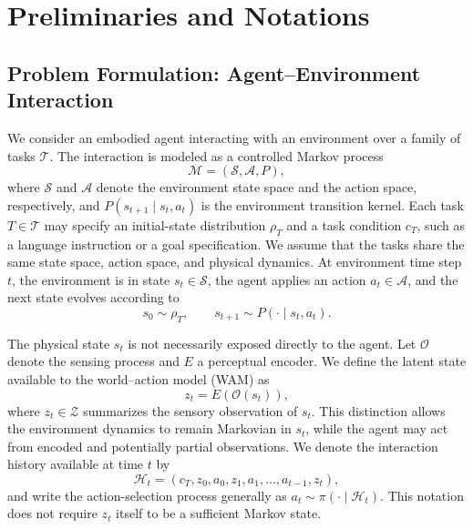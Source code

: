 
\section{Preliminaries and Notations}
\label{sec:preliminaries}


\subsection{Problem Formulation: Agent--Environment Interaction}
\label{sec:preliminaries:problem}

We consider an embodied agent interacting with an environment over a family of tasks
$\mathcal{T}$. The interaction is modeled as a controlled Markov process
\begin{equation}
    \mathcal{M} = (\mathcal{S}, \mathcal{A}, P),
    \label{eq:controlled-markov-process}
\end{equation}
where $\mathcal{S}$ and $\mathcal{A}$ denote the environment state space and the
action space, respectively, and $P(s_{t+1}\mid s_t,a_t)$ is the environment
transition kernel. Each task $T\in\mathcal{T}$ may specify an initial-state
distribution $\rho_T$ and a task condition $c_T$, such as a language instruction
or a goal specification. We assume that the tasks share the same state space, action
space, and physical dynamics. At environment time step $t$, the environment is in
state $s_t\in\mathcal{S}$, the agent applies an action $a_t\in\mathcal{A}$, and
the next state evolves according to
\begin{equation}
    s_0\sim\rho_T,
    \qquad
    s_{t+1}\sim P(\cdot\mid s_t,a_t).
    \label{eq:environment-transition}
\end{equation}

The physical state $s_t$ is not necessarily exposed directly to the agent. Let
$\mathcal{O}$ denote the sensing process and $E$ a perceptual encoder. We define
the latent state available to the world--action model (WAM) as
\begin{equation}
    z_t = E\!\left(\mathcal{O}(s_t)\right),
    \label{eq:latent-state-encoding}
\end{equation}
where $z_t\in\mathcal{Z}$ summarizes the sensory observation of $s_t$. This
distinction allows the environment dynamics to remain Markovian in $s_t$, while
the agent may act from encoded and potentially partial observations. We denote the
interaction history available at time $t$ by
\begin{equation}
    \mathcal{H}_t = (c_T,z_0,a_0,z_1,a_1,\ldots,a_{t-1},z_t),
    \label{eq:interaction-history}
\end{equation}
and write the action-selection process generally as
$a_t\sim\pi(\cdot\mid\mathcal{H}_t)$. This notation does not require $z_t$ itself
to be a sufficient Markov state.

